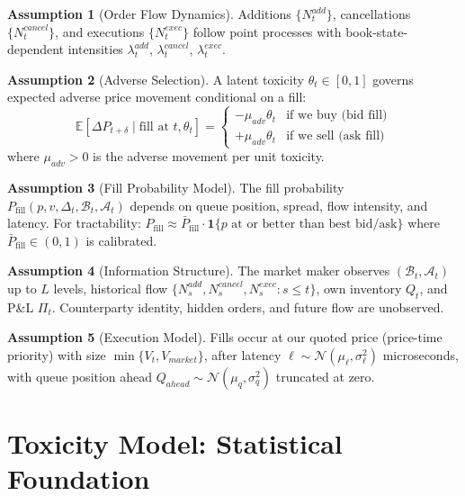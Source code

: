 \documentclass[11pt]{article}
\theoremstyle{definition}
\newtheorem{assumption}{Assumption}[section]
\begin{document}
\begin{assumption}[Order Flow Dynamics]
Additions $\{N_t^{add}\}$, cancellations $\{N_t^{cancel}\}$, and executions $\{N_t^{exec}\}$ follow point processes with book-state-dependent intensities $\lambda_t^{add}$, $\lambda_t^{cancel}$, $\lambda_t^{exec}$.
\end{assumption}

\begin{assumption}[Adverse Selection]
A latent toxicity $\theta_t \in [0,1]$ governs expected adverse price movement conditional on a fill:
\begin{equation}
\mathbb{E}[\Delta P_{t+\delta} \mid \text{fill at } t, \theta_t] = \begin{cases}
-\mu_{adv} \theta_t & \text{if we buy (bid fill)} \\
+\mu_{adv} \theta_t & \text{if we sell (ask fill)}
\end{cases}
\end{equation}
where $\mu_{adv} > 0$ is the adverse movement per unit toxicity.
\end{assumption}

\begin{assumption}[Fill Probability Model]
The fill probability $P_{\text{fill}}(p, v, \Delta_t, \mathcal{B}_t, \mathcal{A}_t)$ depends on queue position, spread, flow intensity, and latency. For tractability: $P_{\text{fill}} \approx \bar{P}_{\text{fill}} \cdot \mathbf{1}\{p \text{ at or better than best bid/ask}\}$ where $\bar{P}_{\text{fill}} \in (0,1)$ is calibrated.
\end{assumption}

\begin{assumption}[Information Structure]
The market maker observes $(\mathcal{B}_t, \mathcal{A}_t)$ up to $L$ levels, historical flow $\{N_s^{add}, N_s^{cancel}, N_s^{exec} : s \leq t\}$, own inventory $Q_t$, and P\&L $\Pi_t$. Counterparty identity, hidden orders, and future flow are unobserved.
\end{assumption}

\begin{assumption}[Execution Model]
Fills occur at our quoted price (price-time priority) with size $\min\{V_t, V_{market}\}$, after latency $\ell \sim \mathcal{N}(\mu_\ell, \sigma_\ell^2)$ microseconds, with queue position ahead $Q_{ahead} \sim \mathcal{N}(\mu_q, \sigma_q^2)$ truncated at zero.
\end{assumption}

\section{Toxicity Model: Statistical Foundation}
\end{document}
